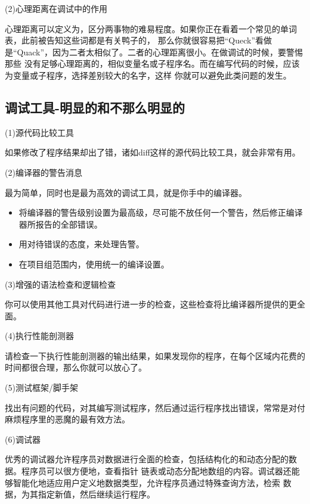 \documentclass{article}
\begin{document}
\par
(2)心理距离在调试中的作用
\par
心理距离可以定义为，区分两事物的难易程度。如果你正在看着一个常见的单词表，此前被告知这些词都是有关鸭子的，
那么你就很容易把“Queck”看做是“Quack”，因为二者太相似了。二者的心理距离很小。在做调试的时候，要警惕那些
没有足够心理距离的，相似变量名或子程序名。而在编写代码的时候，应该为变量或子程序，选择差别较大的名字，这样
你就可以避免此类问题的发生。

\subsection{调试工具-明显的和不那么明显的}
\par
(1)源代码比较工具
\par
如果修改了程序结果却出了错，诸如diff这样的源代码比较工具，就会非常有用。

\par
(2)编译器的警告消息
\par
最为简单，同时也是最为高效的调试工具，就是你手中的编译器。
\begin{itemize}
    \item 将编译器的警告级别设置为最高级，尽可能不放任何一个警告，然后修正编译器所报告的全部错误。
    \item 用对待错误的态度，来处理告警。
    \item 在项目组范围内，使用统一的编译设置。
\end{itemize}

\par
(3)增强的语法检查和逻辑检查
\par
你可以使用其他工具对代码进行进一步的检查，这些检查将比编译器所提供的更全面。

\par
(4)执行性能剖测器
\par
请检查一下执行性能剖测器的输出结果，如果发现你的程序，在每个区域内花费的时间都很合理，那么你就可以放心了。

\par
(5)测试框架/脚手架
\par
找出有问题的代码，对其编写测试程序，然后通过运行程序找出错误，常常是对付麻烦程序里的恶魔的最有效方法。

\par
(6)调试器
\par
优秀的调试器允许程序员对数据进行全面的检查，包括结构化的和动态分配的数据。程序员可以很方便地，查看指针
链表或动态分配地数组的内容。调试器还能够智能化地适应用户定义地数据类型，允许程序员通过特殊查询方法，检索
数据，为其指定新值，然后继续运行程序。
\end{document}
